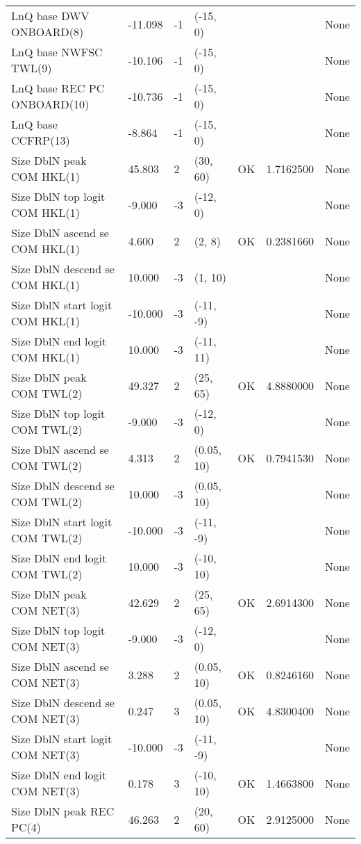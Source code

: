 \documentclass[11pt,
  english,
  a4paper,
]{article}
\begin{document}
\begin{landscape}
\begin{longtable}[t]{>{\raggedright\arraybackslash}p{8.5cm}lllll>{\raggedright\arraybackslash}p{4cm}}
LnQ base DWV ONBOARD(8) & -11.098 & -1 & (-15, 0) &  &  & None\\
LnQ base NWFSC TWL(9) & -10.106 & -1 & (-15, 0) &  &  & None\\
LnQ base REC PC ONBOARD(10) & -10.736 & -1 & (-15, 0) &  &  & None\\
LnQ base CCFRP(13) & -8.864 & -1 & (-15, 0) &  &  & None\\
Size DblN peak COM HKL(1) & 45.803 & 2 & (30, 60) & OK & 1.7162500 & None\\
Size DblN top logit COM HKL(1) & -9.000 & -3 & (-12, 0) &  &  & None\\
Size DblN ascend se COM HKL(1) & 4.600 & 2 & (2, 8) & OK & 0.2381660 & None\\
Size DblN descend se COM HKL(1) & 10.000 & -3 & (1, 10) &  &  & None\\
Size DblN start logit COM HKL(1) & -10.000 & -3 & (-11, -9) &  &  & None\\
Size DblN end logit COM HKL(1) & 10.000 & -3 & (-11, 11) &  &  & None\\
Size DblN peak COM TWL(2) & 49.327 & 2 & (25, 65) & OK & 4.8880000 & None\\
Size DblN top logit COM TWL(2) & -9.000 & -3 & (-12, 0) &  &  & None\\
Size DblN ascend se COM TWL(2) & 4.313 & 2 & (0.05, 10) & OK & 0.7941530 & None\\
Size DblN descend se COM TWL(2) & 10.000 & -3 & (0.05, 10) &  &  & None\\
Size DblN start logit COM TWL(2) & -10.000 & -3 & (-11, -9) &  &  & None\\
Size DblN end logit COM TWL(2) & 10.000 & -3 & (-10, 10) &  &  & None\\
Size DblN peak COM NET(3) & 42.629 & 2 & (25, 65) & OK & 2.6914300 & None\\
Size DblN top logit COM NET(3) & -9.000 & -3 & (-12, 0) &  &  & None\\
Size DblN ascend se COM NET(3) & 3.288 & 2 & (0.05, 10) & OK & 0.8246160 & None\\
Size DblN descend se COM NET(3) & 0.247 & 3 & (0.05, 10) & OK & 4.8300400 & None\\
Size DblN start logit COM NET(3) & -10.000 & -3 & (-11, -9) &  &  & None\\
Size DblN end logit COM NET(3) & 0.178 & 3 & (-10, 10) & OK & 1.4663800 & None\\
Size DblN peak REC PC(4) & 46.263 & 2 & (20, 60) & OK & 2.9125000 & None\\

\end{longtable}
\end{landscape}
\end{document}
